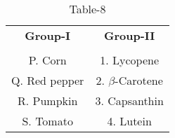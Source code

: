 \begin{table}[htbp]
  \centering
  \caption{Table-8}
  \label{table8}
  \begin{tabular}{cc}
  \textbf{Group-I} & \textbf{Group-II} \\ \\
    P. Corn & 1. Lycopene \\
    Q. Red pepper & 2. $\beta$-Carotene \\
    R. Pumpkin & 3. Capsanthin \\
    S. Tomato & 4. Lutein \\
  \end{tabular}
\end{table}